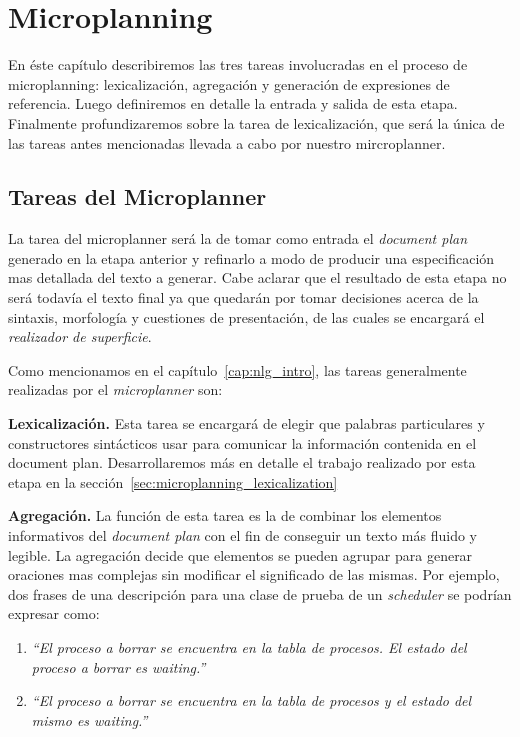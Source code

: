 \chapter{Microplanning}
\label{cap:microplanning}

En éste capítulo describiremos las tres tareas involucradas en el proceso de microplanning: lexicalización, agregación y generación de expresiones de referencia. Luego definiremos en detalle la entrada y salida de esta etapa. Finalmente profundizaremos sobre la tarea de lexicalización, que será la única de las tareas antes mencionadas llevada a cabo por nuestro mircroplanner. 
\section{Tareas del Microplanner}

La tarea del microplanner será la de tomar como entrada el \textit{document plan} generado en la etapa anterior y refinarlo a modo de producir una especificación mas detallada del texto a generar. Cabe aclarar que el resultado de esta etapa no será todavía el texto final ya que quedarán por tomar decisiones acerca de la sintaxis, morfología y cuestiones de presentación, de las cuales se encargará el \emph{realizador de superficie}.

Como mencionamos en el capítulo~\ref{cap:nlg_intro}, las tareas generalmente realizadas por el \emph{microplanner} son:

\medskip
\noindent
\textbf{Lexicalización.} Esta tarea se encargará de elegir que palabras particulares y constructores sintácticos usar para comunicar la información contenida en el document plan. Desarrollaremos más en detalle el trabajo realizado por esta etapa en la sección~\ref{sec:microplanning_lexicalization}


\medskip
\noindent
\textbf{Agregación.} La función de esta tarea es la de combinar los elementos informativos del \emph{document plan} con el fin de conseguir un texto más fluido y legible. La agregación decide que elementos se pueden agrupar para generar oraciones mas complejas sin modificar el significado de las mismas. Por ejemplo, dos frases de una descripción para una clase de prueba de un \emph{scheduler} se podrían expresar como:

\begin{center}
\begin{enumerate}
  \item \emph{``El proceso a borrar se encuentra en la tabla de procesos. El estado del proceso a borrar es waiting.''} 
  \item \emph{``El proceso a borrar se encuentra en la tabla de procesos y el estado del mismo es waiting.''}
\end{enumerate}
\end{center}

